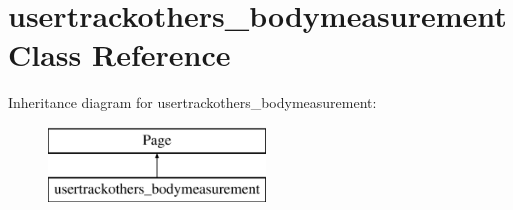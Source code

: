 \hypertarget{classusertrackothers__bodymeasurement}{\section{usertrackothers\-\_\-bodymeasurement Class Reference}
\label{classusertrackothers__bodymeasurement}
}
Inheritance diagram for usertrackothers\-\_\-bodymeasurement\-:\begin{figure}[H]
\begin{center}
\leavevmode
\includegraphics[height=2.000000cm]{classusertrackothers__bodymeasurement}
\end{center}
\end{figure}
